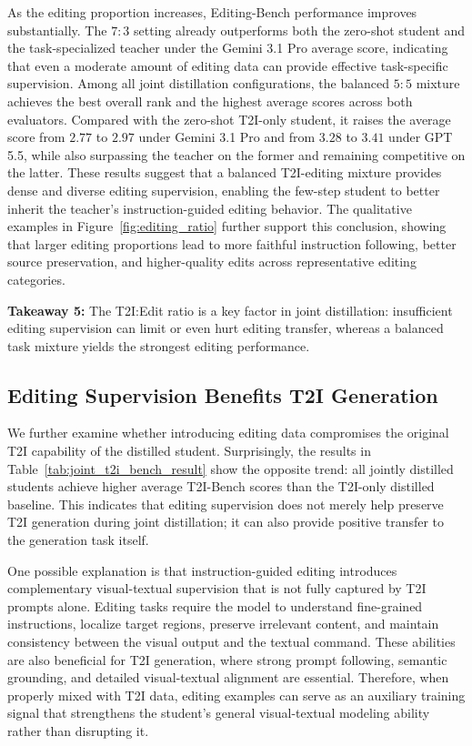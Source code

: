\documentclass{llmxive}
\begin{document}
As the editing proportion increases, Editing-Bench performance improves substantially. The $7{:}3$ setting already outperforms both the zero-shot student and the task-specialized teacher under the Gemini 3.1 Pro average score, indicating that even a moderate amount of editing data can provide effective task-specific supervision. Among all joint distillation configurations, the balanced $5{:}5$ mixture achieves the best overall rank and the highest average scores across both evaluators. Compared with the zero-shot T2I-only student, it raises the average score from $2.77$ to $2.97$ under Gemini 3.1 Pro and from $3.28$ to $3.41$ under GPT 5.5, while also surpassing the teacher on the former and remaining competitive on the latter. These results suggest that a balanced T2I-editing mixture provides dense and diverse editing supervision, enabling the few-step student to better inherit the teacher's instruction-guided editing behavior. The qualitative examples in Figure~\ref{fig:editing_ratio} further support this conclusion, showing that larger editing proportions lead to more faithful instruction following, better source preservation, and higher-quality edits across representative editing categories.


\begin{tcolorbox}[
colback=blue!3,
colframe=blue!70!black,
boxrule=0.8pt,
arc=6pt,
left=6pt,
right=6pt,
top=4pt,
bottom=4pt
]
\textbf{Takeaway 5:} The T2I:Edit ratio is a key factor in joint distillation: insufficient editing supervision can limit or even hurt editing transfer, whereas a balanced task mixture yields the strongest editing performance.
\end{tcolorbox}



\subsection{Editing Supervision Benefits T2I Generation}

We further examine whether introducing editing data compromises the original T2I capability of the distilled student. Surprisingly, the results in Table~\ref{tab:joint_t2i_bench_result} show the opposite trend: all jointly distilled students achieve higher average T2I-Bench scores than the T2I-only distilled baseline. This indicates that editing supervision does not merely help preserve T2I generation during joint distillation; it can also provide positive transfer to the generation task itself.

One possible explanation is that instruction-guided editing introduces complementary visual-textual supervision that is not fully captured by T2I prompts alone. Editing tasks require the model to understand fine-grained instructions, localize target regions, preserve irrelevant content, and maintain consistency between the visual output and the textual command. These abilities are also beneficial for T2I generation, where strong prompt following, semantic grounding, and detailed visual-textual alignment are essential. Therefore, when properly mixed with T2I data, editing examples can serve as an auxiliary training signal that strengthens the student's general visual-textual modeling ability rather than disrupting it.
\end{document}
